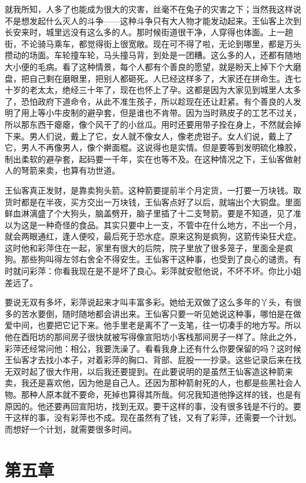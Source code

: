 就我所知，人多了也能成为很大的灾害，丝毫不在兔子的灾害之下；当然我这样说不是想发起什么灭人的斗争——这种斗争只有大人物才能发动起来。王仙客上次到长安来时，城里远没有这么多的人。那时候街道很干净，人穿得也体面。上一趟街，不论骑马乘车，都觉得街上很宽敞。现在可不得了啦，无论到哪里，都是万头攒动的场面。车轮撞车轮，马头撞马背，到处是一团糟。这么多的人，还都有随地大小便的毛病。看了这种情景，每个人都有个善良的愿望，就是盼天上掉下个大磨盘，把自己剩在磨眼里，把别人都砸死。人已经这样多了，大家还在拼命生。连七十岁的老太太，绝经三十年了，现在也怀上了孕。这都是因为大家见到城里人太多了，恐怕政府下道命令，从此不准生孩子，所以趁现在还让赶紧。有个善良的人发明了用上等小牛皮制的避孕套，但是谁也不肯带。因为当时熟皮子的工艺不过关，所以那东西干瘪瘪，像个风干了的小丝瓜。用时还要用带子拴在身上，不然就会掉下来。男人们说，戴上了它，女人就不像女人，像老虎钳子。女人们说，戴上了它，男人不再像男人，像个擀面棍。这说得也是实情。但是要等到发明硫化橡胶，制出柔软的避孕套，起码要一千年，实在也等不及。在这种情况之下，王仙客做射人的弩箭来卖，也算有功世道。 

王仙客真正发财，是靠卖狗头箭。这种箭要提前半个月定货，一打要一万块钱。取货时都是在半夜，买方交出一万块钱，王仙客点好了以后，就端出个大铜盘。里面鲜血淋漓盛了个大狗头，脑盖劈开，脑子里插了十二支弩箭。要是不知道，见了准以为这是一种奇怪的食品。其实只要中上一支，不管中在什么地方，不出一个月，就会两眼通红，逢人便咬，最后死于恐水症。原来这狗是疯狗，这箭传染狂犬症。这时他和彩萍住在一起，家里有很大的后院，院子里放了很多笼子，里面全是疯狗。那些狗叫得左邻右舍全不得安生。王仙客干这种事，也受到了良心的谴责。有时就问彩萍：你看我现在是不是坏了良心。彩萍就安慰他说，不坏不坏。你比小姐差远了。 

要说无双有多坏，彩萍说起来才叫丰富多彩。她给无双做了这么多年的丫头，有很多的苦水要倒，随时随地都会讲出来。王仙客只要一听见她说这种事，哪怕是在做爱中间，也要把它记下来。他手里老是离不了一支笔，往一切凑手的地方写。所以他在酉阳坊的那间房子很快就被写得像宣阳坊小客栈那间房子一样了。除此之外，彩萍还经常问他：相公，我要洗澡了。看看我身上还有什么你要保留的吗？这时候王仙客才去找小本子，对着彩萍的胸口、背部、屁股一一抄录。这些记录后来在找无双时起了很大作用，以后我还要提到。在此要说明的是虽然王仙客造这种箭来卖，我还是喜欢他，因为他是自己人。还因为那种箭射死的人，也都是些黑社会人物。那种人原本就不要命，死掉也算得其所哉。何况我知道他挣这样的钱，也是有原因的。他还要再回宣阳坊，找到无双。要干这样的事，没有很多钱是不行的。要干这样的事，没有彩萍也不成。现在虽然有了钱，又有了彩萍，还需要一个计划。而想好一个计划，就需要很多时间。

\section{第五章}

